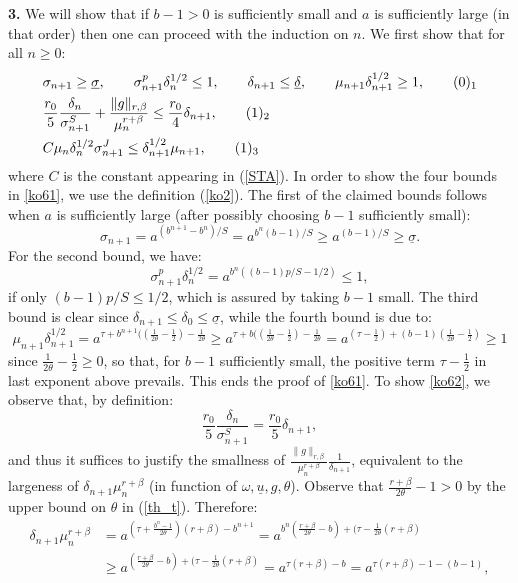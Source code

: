 \documentclass[reqno,twoside,11pt]{amsart}
\numberwithin{equation}{section}
\theoremstyle{plain}
\theoremstyle{definition}
\begin{document}
{\bf 3.} We will show that if $b-1>0$ is
sufficiently small and $a$ is sufficiently large (in that order) then 
one can proceed with the induction on $n$. We first show that for all $n\geq 0$:
\begin{align*}
& \sigma_{n+1}\geq\underline\sigma,\qquad \sigma_{n+1}^p\delta_n^{1/2}\leq 1,
\qquad \delta_{n+1}\leq\underline\delta,\qquad \mu_{n+1}\delta_{n+1}^{1/2}\geq 1,
\tag*{(\theequation)$_1$}\refstepcounter{equation} \label{ko61} \\
& \frac{r_0}{5}\frac{\delta_n}{\sigma_{n+1}^S} +
\frac{\|g\|_{r,\beta}}{\mu_n^{r+\beta}}\leq \frac{r_0}{4}\delta_{n+1},
\tag*{(\theequation)$_2$} \label{ko62}\\
&  C\mu_n\delta_n^{1/2}\sigma_{n+1}^J\leq \delta_{n+1}^{1/2}\mu_{n+1},
\tag*{(\theequation)$_3$} \label{ko63}
\end{align*}
where $C$ is the constant appearing in (\ref{STA}).
In order to show the four bounds in \ref{ko61}, we use the definition
(\ref{ko2}). The first of the claimed bounds follows when $a$ is
sufficiently large (after possibly choosing $b-1$ sufficiently small):
$$\sigma_{n+1}=a^{(b^{n+1}-b^n)/S} = a^{b^n(b-1)/S}\geq a^{(b-1)/S}\geq\underline\sigma.$$
For the second bound, we have:
$$\sigma_{n+1}^p\delta_n^{1/2}= a^{b^n((b-1)p/S - 1/2)}\leq 1,$$
if only $(b-1)p/S\leq 1/2$, which is assured by taking $b-1$ small. The
third bound is clear since $\delta_{n+1}\leq \delta_0\leq
\underline\sigma$, while the fourth bound is due to:
$$ \mu_{n+1}\delta_{n+1}^{1/2} = a^{\tau+b^{n+1}((\frac{1}{2\theta} -
  \frac{1}{2}) - \frac{1}{2\theta}}\geq  a^{\tau+b((\frac{1}{2\theta} -
  \frac{1}{2}) - \frac{1}{2\theta}} = a^{(\tau-\frac{1}{2}) +
  (b-1)(\frac{1}{2\theta}-\frac{1}{2})}\geq 1$$
since $\frac{1}{2\theta}-\frac{1}{2}\geq 0$, so that, for $b-1$
sufficiently small, the positive term $\tau-\frac{1}{2}$ in last
exponent above prevails. This ends the proof of \ref{ko61}.
To show \ref{ko62}, we observe that, by definition:
$$\frac{r_0}{5}\frac{\delta_n}{\sigma_{n+1}^S} =\frac{r_0}{5}\delta_{n+1},$$ 
and thus it suffices to justify the smallness of
$\frac{\|g\|_{r,\beta}}{\mu_n^{r+\beta}}\frac{1}{\delta_{n+1}}$,
equivalent to the largeness of $\delta_{n+1}\mu_n^{r+\beta}$ (in
function of $\omega, \underline u, g, \theta$). Observe that $\frac{r+\beta}{2\theta}-1>0$
by the upper bound on $\theta$ in (\ref{th_t}). Therefore:
\begin{equation*} 
\begin{split}
\delta_{n+1}\mu_n^{r+\beta} & =a^{(\tau
  +\frac{b^n-1}{2\theta})(r+\beta)-b^{n+1} } = a^{b^n(\frac{r+\beta}{2\theta}-b) +
  (\tau-\frac{1}{2\theta}(r+\beta)} \\ & \geq
a^{(\frac{r+\beta}{2\theta}-b) +  (\tau-\frac{1}{2\theta}(r+\beta)}=
a^{\tau(r+\beta)-b}= a^{\tau(r+\beta) -1 -(b-1)},
\end{split}
\end{equation*}
\end{document}
